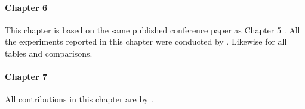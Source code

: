 \paragraph{Chapter 6}
This chapter is based on the same published conference paper
as Chapter 5 \parencite{napoleslopez2021augmentednet}. All
the experiments reported in this chapter were conducted by
\myself{}. Likewise for all tables and comparisons.

\paragraph{Chapter 7}
All contributions in this chapter are by \myself{}.
